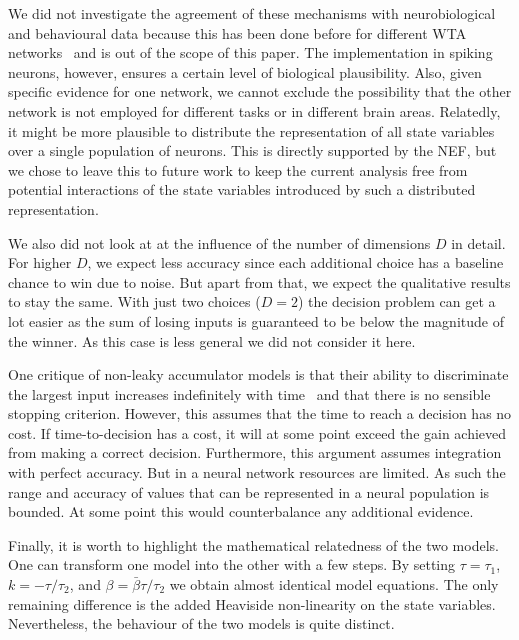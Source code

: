 \documentclass[10pt,letterpaper]{article}
\begin{document}

We did not investigate the agreement of these mechanisms with neurobiological and behavioural data because this has been done before for different WTA networks~\cite{gold2007,smith2004} and is out of the scope of this paper.
The implementation in spiking neurons, however, ensures a certain level of biological plausibility.
Also, given specific evidence for one network, we cannot exclude the possibility that the other network is not employed for different tasks or in different brain areas.
Relatedly, it might be more plausible to distribute the representation of all state variables over a single population of neurons.
This is directly supported by the NEF, but we chose to leave this to future work to keep the current analysis free from potential interactions of the state variables introduced by such a distributed representation.

We also did not look at at the influence of the number of dimensions $D$ in detail.
For higher $D$, we expect less accuracy since each additional choice has a baseline chance to win due to noise.
But apart from that, we expect the qualitative results to stay the same.
With just two choices ($D=2$) the decision problem can get a lot easier as the sum of losing inputs is guaranteed to be below the magnitude of the winner.
As this case is less general we did not consider it here.

One critique of non-leaky accumulator models is that their ability to discriminate the largest input increases indefinitely with time~\cite{usher2001} and that there is no sensible stopping criterion.
However, this assumes that the time to reach a decision has no cost.
If time-to-decision has a cost, it will at some point exceed the gain achieved from making a correct decision.
Furthermore, this argument assumes integration with perfect accuracy.
But in a neural network resources are limited.
As such the range and accuracy of values that can be represented in a neural population is bounded.
At some point this would counterbalance any additional evidence.

Finally, it is worth to highlight the mathematical relatedness of the two models.
One can transform one model into the other with a few steps.
By setting $\tau = \tau_1$, $k = -\tau/\tau_2$, and $\beta = \bar{\beta}\tau/\tau_2$ we obtain almost identical model equations.
The only remaining difference is the added Heaviside non-linearity on the state variables.
Nevertheless, the behaviour of the two models is quite distinct.
\end{document}

